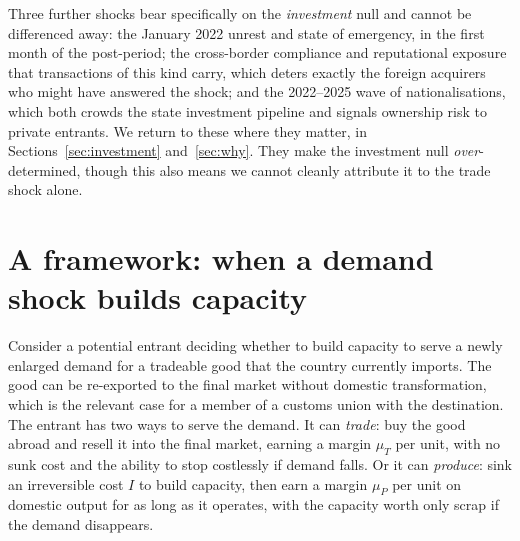 \documentclass[12pt]{article}
\begin{document}
Three further shocks bear specifically on the \emph{investment} null and cannot be differenced
away: the January 2022 unrest and state of emergency, in the first month of
the post-period; the cross-border compliance and reputational exposure that transactions of
this kind carry, which deters exactly the foreign acquirers who might have answered the shock;
and the 2022--2025 wave of nationalisations, which both crowds the state investment pipeline and
signals ownership risk to private entrants. We return to these where they matter, in
Sections~\ref{sec:investment} and~\ref{sec:why}. They make the investment null
\emph{over}-determined, though this also means we cannot cleanly attribute it
to the trade shock alone.

\section{A framework: when a demand shock builds capacity}\label{sec:framework}

Consider a potential entrant deciding whether to build capacity to serve a newly enlarged
demand for a tradeable good that the country currently imports. The good can be re-exported to
the final market without domestic transformation, which is the relevant case for a member of a
customs union with the destination. The entrant has two ways to serve the demand. It can
\emph{trade}: buy the good abroad and resell it into the final market, earning a margin
$\mu_T$ per unit, with no sunk cost and the ability to stop costlessly if demand falls. Or it
can \emph{produce}: sink an irreversible cost $I$ to build capacity, then earn a margin
$\mu_P$ per unit on domestic output for as long as it operates, with the capacity worth only
scrap if the demand disappears.
\end{document}
